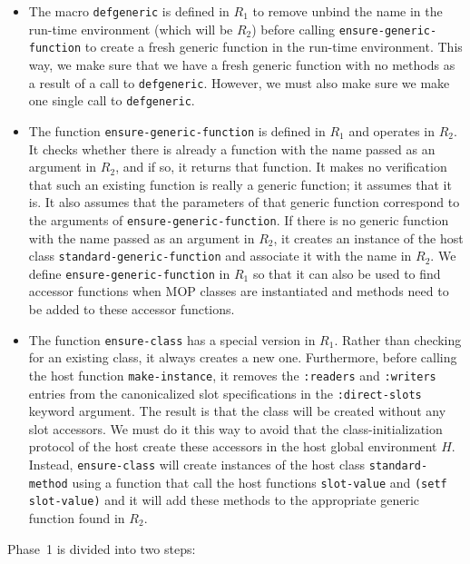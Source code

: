 \begin{itemize}
\item The macro \texttt{defgeneric} is defined in $R_1$ to remove
  unbind the name in the run-time environment (which will be $R_2$)
  before calling \texttt{ensure-generic-function} to create a fresh
  generic function in the run-time environment.  This way, we make
  sure that we have a fresh generic function with no methods as a
  result of a call to \texttt{defgeneric}.  However, we must also make
  sure we make one single call to \texttt{defgeneric}.
\item The function \texttt{ensure-generic-function} is defined in
  $R_1$ and operates in $R_2$.  It checks whether there is already a
  function with the name passed as an argument in $R_2$, and if so, it
  returns that function.  It makes no verification that such an
  existing function is really a generic function; it assumes that it
  is.  It also assumes that the parameters of that generic function
  correspond to the arguments of \texttt{ensure-generic-function}.  If
  there is no generic function with the name passed as an argument in
  $R_2$, it creates an instance of the host class
  \texttt{standard-generic-function} and associate it with the name in
  $R_2$.  We define \texttt{ensure-generic-function} in $R_1$ so that
  it can also be used to find accessor functions when MOP classes are
  instantiated and methods need to be added to these accessor
  functions.
\item The function \texttt{ensure-class} has a special version in
  $R_1$.  Rather than checking for an existing class, it always
  creates a new one.  Furthermore, before calling the host function
  \texttt{make-instance}, it removes the \texttt{:readers} and
  \texttt{:writers} entries from the canonicalized slot specifications
  in the \texttt{:direct-slots} keyword argument.  The result is that
  the class will be created without any slot accessors.  We must do it
  this way to avoid that the class-initialization protocol of the host
  create these accessors in the host global environment $H$.  Instead,
  \texttt{ensure-class} will create instances of the host class
  \texttt{standard-method} using a function that call the host
  functions \texttt{slot-value} and \texttt{(setf slot-value)} and it
  will add these methods to the appropriate generic function found in
  $R_2$.
\end{itemize}

Phase~1 is divided into two steps:

